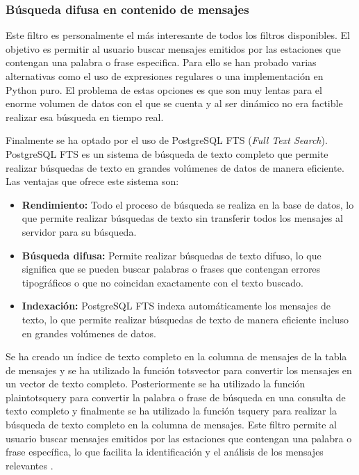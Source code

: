 \subsubsection*{Búsqueda difusa en contenido de mensajes}
Este filtro es personalmente el más interesante de todos los filtros disponibles. El objetivo es permitir al usuario buscar mensajes emitidos por las estaciones que contengan una palabra o frase especifica. Para ello se han probado varias alternativas como el uso de expresiones regulares o una implementación en Python puro. El problema de estas opciones es que son muy lentas para el enorme volumen de datos con el que se cuenta y al ser dinámico no era factible realizar esa búsqueda en tiempo real.

Finalmente se ha optado por el uso de PostgreSQL FTS (\textit{Full Text Search}). PostgreSQL FTS es un sistema de búsqueda de texto completo que permite realizar búsquedas de texto en grandes volúmenes de datos de manera eficiente. Las ventajas que ofrece este sistema son:

\begin{itemize}
	\item \textbf{Rendimiento:} Todo el proceso de búsqueda se realiza en la base de datos, lo que permite realizar búsquedas de texto sin transferir todos los mensajes al servidor para su búsqueda.
	\item \textbf{Búsqueda difusa:} Permite realizar búsquedas de texto difuso, lo que significa que se pueden buscar palabras o frases que contengan errores tipográficos o que no coincidan exactamente con el texto buscado.
	\item \textbf{Indexación:} PostgreSQL FTS indexa automáticamente los mensajes de texto, lo que permite realizar búsquedas de texto de manera eficiente incluso en grandes volúmenes de datos.
\end{itemize}

Se ha creado un índice de texto completo en la columna de mensajes de la tabla de mensajes y se ha utilizado la función to\textunderscore tsvector para convertir los mensajes en un vector de texto completo. Posteriormente se ha utilizado la función plainto\textunderscore tsquery para convertir la palabra o frase de búsqueda en una consulta de texto completo y finalmente se ha utilizado la función ts\textunderscore query para realizar la búsqueda de texto completo en la columna de mensajes. Este filtro permite al usuario buscar mensajes emitidos por las estaciones que contengan una palabra o frase específica, lo que facilita la identificación y el análisis de los mensajes relevantes \cite{PostgreSQLFTS}.

